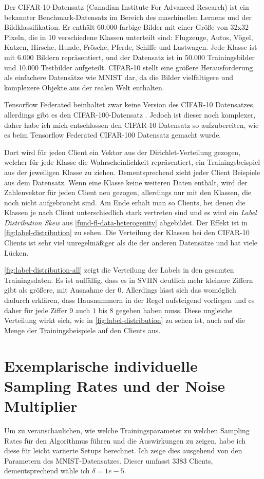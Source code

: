 Der CIFAR-10-Datensatz (Canadian Institute For Advanced Research) ist ein bekannter Benchmark-Datensatz im Bereich des maschinellen Lernens und der Bildklassifikation. Er enthält 60.000 farbige Bilder mit einer Größe von 32x32 Pixeln, die in 10 verschiedene Klassen unterteilt sind: Flugzeuge, Autos, Vögel, Katzen, Hirsche, Hunde, Frösche, Pferde, Schiffe und Lastwagen. Jede Klasse ist mit 6.000 Bildern repräsentiert, und der Datensatz ist in 50.000 Trainingsbilder und 10.000 Testbilder aufgeteilt. CIFAR-10 stellt eine größere Herausforderung als einfachere Datensätze wie MNIST dar, da die Bilder vielfältigere und komplexere Objekte aus der realen Welt enthalten. 

Tensorflow Federated beinhaltet zwar keine Version des CIFAR-10 Datensatzes, allerdings gibt es den CIFAR-100-Datensatz \cite{krizhevsky:2009}. Jedoch ist dieser noch komplexer, daher habe ich mich entschlossen den CIFAR-10 Datensatz so aufzubereiten, wie es beim Tensorflow Federated CIFAR-100 Datensatz gemacht wurde. 

Dort wird für jeden Client ein Vektor aus der Dirichlet-Verteilung gezogen, welcher für jede Klasse die Wahrscheinlichkeit repräsentiert, ein Trainingsbeispiel aus der jeweiligen Klasse zu ziehen. Dementsprechend zieht jeder Client Beispiele aus dem Datensatz. Wenn eine Klasse keine weiteren Daten enthält, wird der Zahlenvektor für jeden Client neu gezogen, allerdings nur mit den Klassen, die noch nicht aufgebraucht sind. Am Ende erhält man so Clients, bei denen die Klassen je nach Client unterschiedlich stark vertreten sind und es wird ein \textit{Label Distribution Skew} aus \autoref{fund-fl-data-heterogenity} abgebildet. Der Effekt ist in \autoref{fig:label-distribution} zu sehen. Die Verteilung der Klassen bei den CIFAR-10 Clients ist sehr viel unregelmäßiger als die der anderen Datensätze und hat viele Lücken.

\autoref{fig:label-distribution-all} zeigt die Verteilung der Labels in den gesamten Trainingsdaten. Es ist auffällig, dass es in SVHN deutlich mehr kleinere Ziffern gibt als größere, mit Ausnahme der $0$. Allerdings lässt sich das womöglich dadurch erklären, dass Hausnummern in der Regel aufsteigend vorliegen und es daher für jede Ziffer $9$ auch $1$ bis $8$ gegeben haben muss. Diese ungleiche Verteilung wirkt sich, wie in \autoref{fig:label-distribution} zu sehen ist, auch auf die Menge der Trainingsbeispiele auf den Clients aus.

\section{Exemplarische individuelle Sampling Rates und der Noise Multiplier}
Um zu veranschaulichen, wie welche Trainingsparameter zu welchen Sampling Rates für den Algorithmus führen und die Auswirkungen zu zeigen, habe ich diese für leicht variierte Setups berechnet. Ich zeige dies ausgehend von den Parametern des MNIST-Datensatzes. Dieser umfasst $3383$ Clients, dementsprechend wähle ich $\delta= 1e-5$. 

